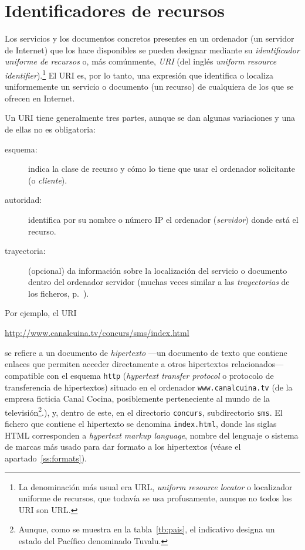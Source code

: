 \section{Identificadores de recursos} Los servicios y los documentos concretos presentes en un ordenador (un servidor de Internet) que los hace disponibles se pueden designar mediante su \emph{identificador uniforme de recursos} o, más comúnmente, \emph{URI} (del inglés \emph{uniform resource identifier}).\footnote{La denominación más usual era URL, \emph{uniform resource locator} o localizador uniforme de recursos, que todavía se usa profusamente, aunque no todos los URI son URL.} El URI es, por lo tanto, una expresión que identifica o localiza uniformemente un servicio o documento (un recurso) de cualquiera de los que se ofrecen en Internet. 

Un URI tiene generalmente tres partes, aunque se dan algunas variaciones y una de ellas no es obligatoria: \begin{description} \item[esquema:] indica la clase de recurso y cómo lo tiene que usar el ordenador solicitante (o \emph{cliente}). \item[autoridad:] identifica por su nombre o número IP el ordenador (\emph{servidor}) donde está el recurso. \item[trayectoria:] (opcional) da información sobre la localización del servicio o documento dentro del ordenador servidor (muchas veces similar a las \emph{trayectorias} de los ficheros, p.~\pageref{pg:fitxer}). \end{description} Por ejemplo, el URI \begin{center} \url{http://www.canalcuina.tv/concurs/sms/index.html} \end{center} se refiere a un documento de \emph{hipertexto} ---un documento de texto que contiene enlaces que permiten acceder directamente a otros hipertextos relacionados--- compatible con el esquema \texttt{http} (\emph{hypertext transfer protocol} o protocolo de transferencia de hipertextos) situado en el ordenador \texttt{www.canalcuina.tv} (de la empresa ficticia Canal Cocina, posiblemente perteneciente al mundo de la televisión\footnote{Aunque, como se muestra en la tabla~\ref{tb:pais}, el indicativo designa un estado del Pacífico denominado Tuvalu.}.), y, dentro de este, en el directorio \texttt{concurs}, subdirectorio \texttt{sms}. El fichero que contiene el hipertexto se denomina \texttt{index.html}, donde las siglas HTML corresponden a \emph{hypertext markup language}, nombre del lenguaje o sistema de marcas más usado para dar formato a los hipertextos (véase el apartado~\ref{ss:formats}). 

